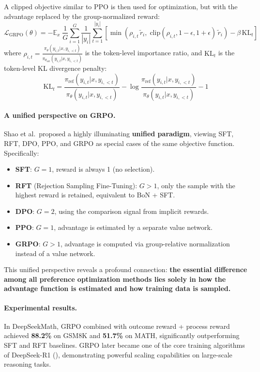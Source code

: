 A clipped objective similar to PPO is then used for optimization,
but with the advantage replaced by the group-normalized reward:
\begin{equation}
\label{eq:pref:grpo-obj}
\mathcal{L}_{\text{GRPO}}(\theta) = -\mathbb{E}_{x}\; \frac{1}{G} \sum_{i=1}^{G} \frac{1}{|y_i|} \sum_{t=1}^{|y_i|}
\left[
  \min\!\left(
    \rho_{i,t}\, \tilde{r}_i,\;
    \text{clip}(\rho_{i,t}, 1{-}\epsilon, 1{+}\epsilon)\, \tilde{r}_i
  \right)
  - \beta\, \text{KL}_t
\right]
\end{equation}
where $\rho_{i,t} = \frac{\pi_\theta(y_{i,t} | x, y_{i,<t})}{\pi_{\theta_{\text{old}}}(y_{i,t} | x, y_{i,<t})}$
is the token-level importance ratio,
and $\text{KL}_t$ is the token-level KL divergence penalty:
\begin{equation}
\text{KL}_t = \frac{\pi_{\text{ref}}(y_{i,t} | x, y_{i,<t})}{\pi_\theta(y_{i,t} | x, y_{i,<t})} - \log \frac{\pi_{\text{ref}}(y_{i,t} | x, y_{i,<t})}{\pi_\theta(y_{i,t} | x, y_{i,<t})} - 1
\end{equation}

\paragraph{A unified perspective on GRPO.}
Shao et al.\ proposed a highly illuminating \textbf{unified paradigm},
viewing SFT, RFT, DPO, PPO, and GRPO as special cases of the same objective function.
Specifically:
\begin{itemize}[leftmargin=2em]
  \item \textbf{SFT}: $G=1$, reward is always 1 (no selection).
  \item \textbf{RFT} (Rejection Sampling Fine-Tuning):
    $G>1$, only the sample with the highest reward is retained, equivalent to BoN + SFT.
  \item \textbf{DPO}: $G=2$, using the comparison signal from implicit rewards.
  \item \textbf{PPO}: $G=1$, advantage is estimated by a separate value network.
  \item \textbf{GRPO}: $G>1$, advantage is computed via group-relative normalization instead of a value network.
\end{itemize}

\noindent
This unified perspective reveals a profound connection:
\textbf{the essential difference among all preference optimization methods lies solely in
how the advantage function is estimated and how training data is sampled.}

\paragraph{Experimental results.}
In DeepSeekMath, GRPO combined with outcome reward + process reward
achieved \textbf{88.2\%} on GSM8K and \textbf{51.7\%} on MATH,
significantly outperforming SFT and RFT baselines.
GRPO later became one of the core training algorithms of DeepSeek-R1 \cite{deepseek2025r1}
(),
demonstrating powerful scaling capabilities on large-scale reasoning tasks.

